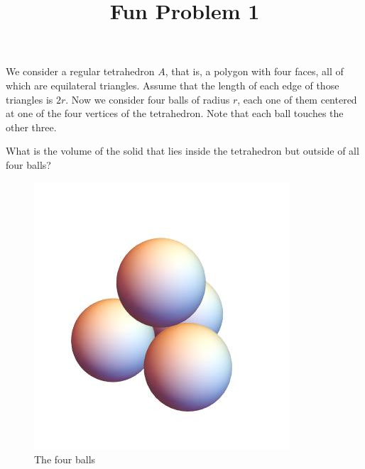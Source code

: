 \documentclass{article}
\title{Fun Problem 1}
\begin{document}
\maketitle

We consider a regular tetrahedron $A$, that is, a polygon with four faces, all of which are equilateral triangles. Assume that the length of each edge of those triangles is $2r$. Now we consider four balls of radius $r$, each one of them centered at one of the four vertices of the tetrahedron. Note that each ball touches the other three.

 What is the volume of the solid that lies inside the tetrahedron but outside of all four balls?

\begin{figure}[h]
  \begin{center}
  \includegraphics[scale=.5]{balls.jpeg}
  \caption{The four balls}
  \label{}
\end{center}

\end{figure}
\end{document}
